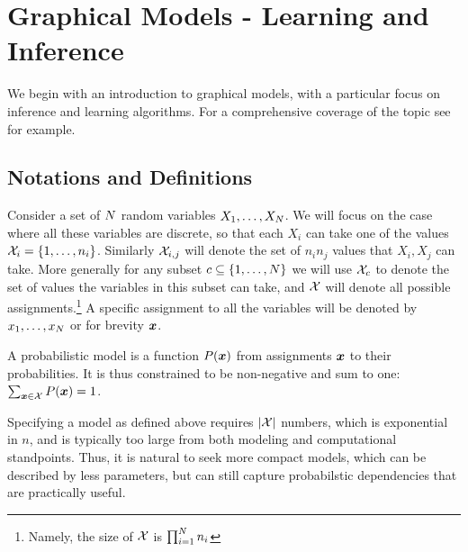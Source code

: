\section{Graphical Models - Learning and Inference}
We begin with an introduction to graphical models, with a particular focus on inference and learning algorithms. For a comprehensive coverage of the topic see for example\cite{koller2009probabilistic}.
\subsection{Notations and Definitions}
\label{sec:def}
Consider a set of $N$ random variables $X_1,\ldots,X_{N}$. We will focus on the case where all these variables are discrete,  so that each $X_i$ can take one of the values ${\cal X}_i = \{1,\ldots,n_i\}$. Similarly ${\cal X}_{i,j}$ will denote the set of $n_i n_j$ values that $X_i,X_j$ can take. More generally for any subset $c\subseteq \{1,\ldots,N\}$ we will use ${\cal X}_c$ to denote the set of values the variables in this subset can take, and ${\cal X}$ will denote all possible assignments.\footnote{Namely, the size of ${\cal X}$ is $\prod_{i=1}^{N} n_i$} A specific assignment to all the variables will be denoted by $x_1,\ldots,x_{N}$ or for brevity $\boldsymbol{x}$. 

A probabilistic model is a function $P(\boldsymbol{x})$ from assignments $\boldsymbol{x}$ to their probabilities. It is thus constrained to be non-negative and sum to one: $\sum_{\boldsymbol{x} \in {\cal X}} P(\boldsymbol{x}) = 1$.

Specifying a model as defined above requires $|{\cal X}|$ numbers, which is exponential in $n$, and is typically too large from both modeling and computational standpoints. Thus, it is natural to seek more compact models, which can be described by less parameters, but can still capture probabilstic dependencies that are practically useful.

